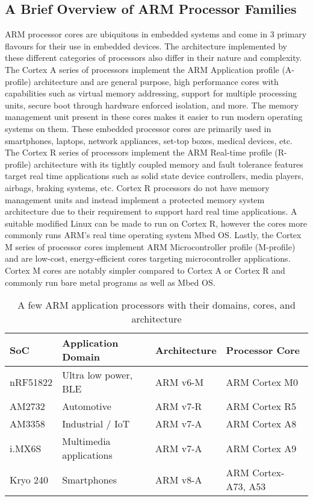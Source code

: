 \subsection{A Brief Overview of ARM Processor Families}

ARM processor cores are ubiquitous in embedded systems and come in 3 primary flavours for their use in embedded devices. The architecture implemented by these different categories of processors also differ in their nature and complexity. The Cortex A series of processors implement the ARM Application profile (A-profile) architecture and are general purpose, high performance cores with capabilities such as virtual memory addressing, support for multiple processing units, secure boot through hardware enforced isolation, and more. The memory management unit present in these cores makes it easier to run modern operating systems on them. These embedded processor cores are primarily used in smartphones, laptops, network appliances, set-top boxes, medical devices, etc. The Cortex R series of processors implement the ARM Real-time profile (R-profile) architecture with its tightly coupled memory and fault tolerance features target real time applications such as solid state device controllers, media players, airbags, braking systems, etc. Cortex R processors do not have memory management units and instead implement a protected memory system architecture due to their requirement to support hard real time applications. A suitable modified Linux can be made to run on Cortex R, however the cores more commonly runs ARM's real time operating system Mbed OS. Lastly, the Cortex M series of processor cores implement ARM Microcontroller profile (M-profile) and are low-cost, energy-efficient cores targeting microcontroller applications. Cortex M cores are notably simpler compared to Cortex A or Cortex R and commonly run bare metal programs as well as Mbed OS.

\begin{table}[h]
	\centering
	\begin{tabular}{ |p{5em}|p{10em}|p{7em}|p{10em}| }
		\hline
			\textbf{SoC} &
			\textbf{Application Domain} &
			\textbf{Architecture} &
			\textbf{Processor Core} \\
		\hline
			nRF51822 &
			Ultra low power, BLE &
			ARM v6-M &
			ARM Cortex M0 \\
		\hline
			AM2732 &
			Automotive &
			ARM v7-R &
			ARM Cortex R5 \\
		\hline
			AM3358 &
			Industrial / IoT &
			ARM v7-A &
			ARM Cortex A8 \\
		\hline
			i.MX6S &
			Multimedia applications &
			ARM v7-A &
			ARM Cortex A9 \\
		\hline
			Kryo 240 &
			Smartphones &
			ARM v8-A &
			ARM Cortex-A73, A53 \\
		\hline
	\end{tabular}
	\caption{A few ARM application processors with their domains, cores, and architecture}
	\label{table:arm}
\end{table}

